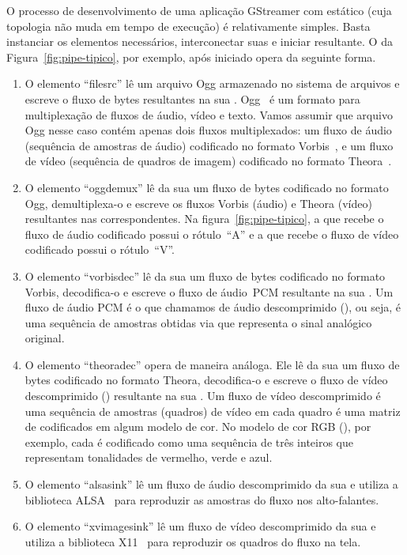 \documentclass{SBCbookchapter}
\begin{document}
O processo de desenvolvimento de uma aplicação GStreamer com 
estático (cuja topologia não muda em tempo de execução) é relativamente
simples.  Basta instanciar os elementos necessários, interconectar suas
 e iniciar  resultante.  O  da
Figura~\ref{fig:pipe-tipico}, por exemplo, após iniciado opera da seguinte
forma.
\begin{enumerate}
\item O elemento ``filesrc'' lê um arquivo Ogg armazenado no sistema de
  arquivos e escreve o fluxo de bytes resultantes na sua .
  Ogg~\cite{ogg-rfc-3533} é um formato para multiplexação de fluxos de
  áudio, vídeo e texto.  Vamos assumir que arquivo Ogg nesse caso contém
  apenas dois fluxos multiplexados: um fluxo de áudio (sequência de amostras
  de áudio) codificado no formato Vorbis~\cite{vorbis}, e um fluxo de vídeo
  (sequência de quadros de imagem) codificado no formato
  Theora~\cite{theora}.
\item O elemento ``oggdemux'' lê da sua  um fluxo de bytes
  codificado no formato Ogg, demultiplexa-o e escreve os fluxos Vorbis
  (áudio) e Theora (vídeo) resultantes nas  correspondentes.
  Na figura~\ref{fig:pipe-tipico}, a  que recebe o fluxo
  de áudio codificado possui o rótulo~``A'' e a  que recebe o
  fluxo de vídeo codificado possui o rótulo~``V''.
\item O elemento ``vorbisdec'' lê da sua  um fluxo de bytes
  codificado no formato Vorbis, decodifica-o e escreve o fluxo de áudio~PCM
  resultante na sua .  Um fluxo de áudio PCM é o que chamamos
  de áudio descomprimido (), ou seja, é uma sequência de amostras
  obtidas via  que representa o sinal analógico
  original.
\item O elemento ``theoradec'' opera de maneira análoga.  Ele lê da sua
   um fluxo de bytes codificado no formato Theora, decodifica-o
  e escreve o fluxo de vídeo descomprimido () resultante na sua
  .  Um fluxo de vídeo descomprimido é uma sequência de
  amostras (quadros) de vídeo em cada quadro é uma matriz de 
  codificados em algum modelo de cor.  No modelo de cor RGB
  (), por exemplo, cada  é codificado como uma
  sequência de três inteiros que representam tonalidades de vermelho, verde
  e azul.
\item O elemento ``alsasink'' lê um fluxo de áudio descomprimido da sua
   e utiliza a biblioteca ALSA~\cite{alsa} para reproduzir as
  amostras do fluxo nos alto-falantes.
\item O elemento ``xvimagesink'' lê um fluxo de vídeo descomprimido da sua
   e utiliza a biblioteca X11~\cite{x11} para reproduzir os
  quadros do fluxo na tela.
\end{enumerate}
\end{document}
